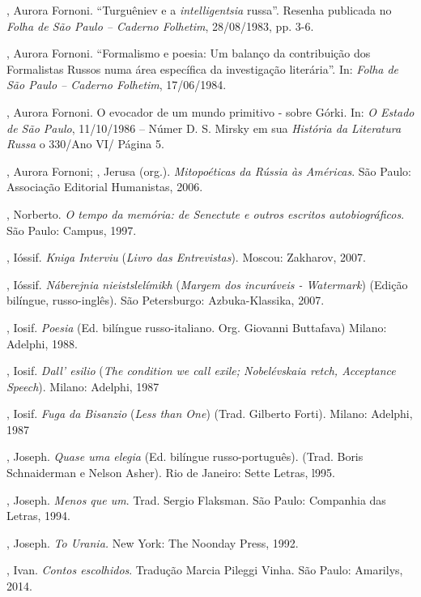 , Aurora Fornoni. ``Turguêniev e a \emph{intelligentsia}
russa''. Resenha publicada no \emph{Folha de São Paulo -- Caderno
Folhetim}, 28/08/1983, pp. 3-6.

, Aurora Fornoni. ``Formalismo e poesia: Um balanço da
contribuição dos Formalistas Russos numa área específica da investigação
literária''. In: \emph{Folha de São Paulo -- Caderno Folhetim},
17/06/1984.

, Aurora Fornoni. O evocador de um mundo primitivo - sobre
Górki. In: \emph{O Estado de São Paulo}, 11/10/1986 -- Númer D. S. Mirsky
em sua \emph{História da Literatura Russa} o 330/Ano VI/ Página 5.

, Aurora Fornoni; , Jerusa (org.). \emph{Mitopoéticas da Rússia às
Américas}. São Paulo: Associação Editorial Humanistas, 2006.

, Norberto. \emph{O tempo da memória: de Senectute e outros escritos
autobiográficos}. São Paulo: Campus, 1997.

, Ióssif. \emph{Kniga Interviu} (\emph{Livro das Entrevistas}).
Moscou: Zakharov, 2007.

, Ióssif. \emph{Náberejnia nieistslelímikh} (\emph{Margem dos
incuráveis - Watermark}) (Edição bilíngue, russo-inglês). São
Petersburgo: Azbuka-Klassika, 2007.

, Iosif. \emph{Poesia} (Ed. bilíngue russo-italiano. Org.
Giovanni Buttafava) Milano: Adelphi, 1988.

, Iosif. \emph{Dall' esilio} (\emph{The condition we call exile;
Nobelévskaia retch, Acceptance Speech}). Milano: Adelphi, 1987

, Iosif. \emph{Fuga da Bisanzio} (\emph{Less than One}) (Trad.
Gilberto Forti). Milano: Adelphi, 1987

, Joseph. \emph{Quase uma elegia} (Ed. bilíngue russo-português).
(Trad. Boris Schnaiderman e Nelson Asher). Rio de Janeiro: Sette Letras,
l995.

, Joseph. \emph{Menos que um}. Trad. Sergio Flaksman. São
Paulo: Companhia das Letras, 1994.

, Joseph. \emph{To Urania.} New York: The Noonday Press, 1992.

, Ivan. \emph{Contos escolhidos}. Tradução Marcia Pileggi Vinha. São Paulo: Amarilys, 2014.

